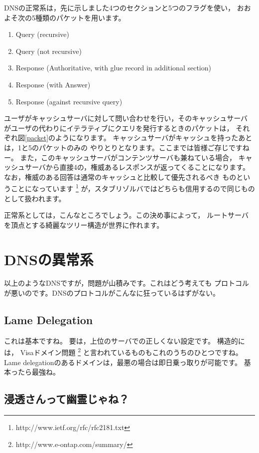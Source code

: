 DNSの正常系は，先に示しました4つのセクションと5つのフラグを使い，
おおよそ次の5種類のパケットを用います。
{\small
\begin{enumerate}
  \item Query (recursive)
  \item Query (not recursive)
  \item Response (Authoritative, with glue record in additional section)
  \item Response (with Answer)
  \item Response (against recursive query)
\end{enumerate}
}

ユーザがキャッシュサーバに対して問い合わせを行い，そのキャッシュサーバ
がユーザの代わりにイテラティブにクエリを発行するときのパケットは，
それぞれ図\ref{packet}のようになります。
キャッシュサーバがキャッシュを持ったあとは，1と5のパケットのみの
やりとりとなります。ここまでは皆様ご存じですねー。
また，このキャッシュサーバがコンテンツサーバも兼ねている場合，
キャッシュサーバから直接4の，権威あるレスポンスが返ってくることになります。
なお，権威のある回答は通常のキャッシュと比較して優先されるべき
ものということになっています
\footnote{http://www.ietf.org/rfc/rfc2181.txt}
が，スタブリゾルバではどちらも信用するので同じものとして扱われます。

正常系としては，こんなところでしょう。この決め事によって，
ルートサーバを頂点とする綺麗なツリー構造が世界に作れます。


\section { DNSの異常系 }
以上のようなDNSですが，問題が山積みです。これはどう考えても
プロトコルが悪いのです。DNSのプロトコルがこんなに狂っているはずがない。

\subsection{ Lame Delegation }
これは基本ですね。 要は，上位のサーバでの正しくない設定です。
構造的には， Visaドメイン問題 
\footnote{http://www.e-ontap.com/summary/}
と言われているものもこれのうちのひとつですね。
Lame delegationのあるドメインは，最悪の場合は即日乗っ取りが可能です。
基本ったら最強ね。


\subsection{ 浸透さんって幽霊じゃね？ }

